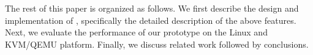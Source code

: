 
The rest of this paper is organized as follows.
We first describe the design and implementation of \sna,
specifically the detailed description of the above features.
Next, we evaluate the performance of our \na prototype
on the Linux and KVM/QEMU platform.
Finally, we discuss related work followed by conclusions.


